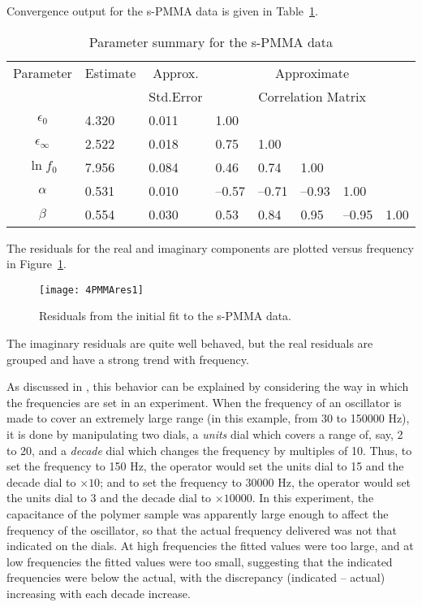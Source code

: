 \begin{example}\label{spmma:3}
Convergence output for the s-PMMA data is given in
Table~\ref{tbl:4.2}.
\begin{table}
  \caption{\label{tbl:4.2}
  Parameter summary for the s-PMMA data
  }
  \begin{center}
    \begin{tabular}{clllllll}\hline
      \multicolumn{1}{c}{Parameter} & \multicolumn{1}{c}{Estimate} &
      \multicolumn{1}{c}{Approx.} & \multicolumn{5}{c}{Approximate}\\
      && \multicolumn{1}{c}{Std.Error} &
      \multicolumn{5}{c}{Correlation Matrix}\\ \hline
      $\epsilon_{0}$&4.320&0.011&1.00\\
      $\epsilon_{\infty}$&2.522&0.018&0.75&1.00\\
      $\ln f_{0}$&7.956&0.084&0.46&0.74&1.00\\
      $\alpha$&0.531&0.010&--\/0.57&--\/0.71&--\/0.93&1.00\\
      $\beta$&0.554&0.030&0.53&0.84&0.95&--\/0.95&1.00\\ \hline
    \end{tabular}
  \end{center}
\end{table}
The residuals for the real and imaginary components are
plotted versus frequency in
Figure~\ref{fig:PMMAres1}.
\begin{figure}
  \centerline{\texttt{[image: 4PMMAres1]}}%
  \caption{\label{fig:PMMAres1}
  Residuals from the initial fit to the s-PMMA data.
  }
\end{figure}
The imaginary residuals are quite well behaved, but the
real residuals are grouped and have a strong trend
with frequency.

As discussed in ,
this behavior can be explained by considering the way in
which the frequencies are set in an experiment.
When the frequency of an oscillator is made to cover an
extremely large range (in this example, from 30 to
150000 Hz), it is done by manipulating two dials, a {\em units\/}
dial which covers a range of, say, 2 to 20,
and a {\em decade\/} dial which changes the frequency by
multiples of 10.
Thus, to set the frequency to 150 Hz, the
operator would set the units dial to 15 and the
decade dial to $\times 10$; and to set the frequency to 30000
Hz, the operator would set the units dial to 3 and the
decade dial to $\times 10000$.
In this experiment, the capacitance of
the polymer sample was apparently large enough to affect the
frequency of the oscillator, so that the actual frequency
delivered was not that indicated on the dials.
At high
frequencies the fitted values were too large, and at low
frequencies the fitted values were too small, suggesting
that the indicated frequencies were below the actual, with
the discrepancy (indicated -- actual) increasing with each decade
increase.


\end{example}
